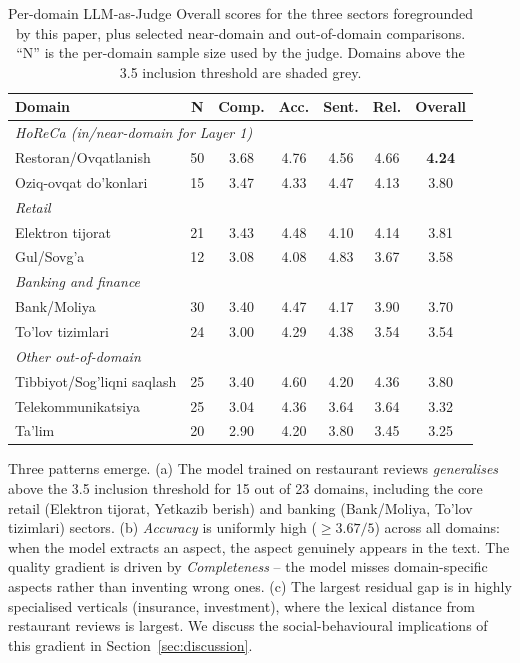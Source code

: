 \documentclass[runningheads]{llncs}
\begin{document}
\begin{table}[!htbp]
\centering
\caption{Per-domain LLM-as-Judge Overall scores for the three sectors
foregrounded by this paper, plus selected near-domain and out-of-domain
comparisons. ``N'' is the per-domain sample size used by the judge.
Domains above the 3.5 inclusion threshold are shaded grey.}
\label{tab:judge-domain}
\renewcommand{\arraystretch}{1.1}
\setlength{\tabcolsep}{6pt}
\begin{tabular}{l|c|ccccc}
\toprule
\textbf{Domain} & \textbf{N} & Comp. & Acc. & Sent. & Rel. & \textbf{Overall} \\
\midrule
\multicolumn{7}{l}{\textit{HoReCa (in/near-domain for Layer 1)}} \\
Restoran/Ovqatlanish      & 50 & 3.68 & 4.76 & 4.56 & 4.66 & \textbf{4.24} \\
Oziq-ovqat do'konlari     & 15 & 3.47 & 4.33 & 4.47 & 4.13 & 3.80 \\
\midrule
\multicolumn{7}{l}{\textit{Retail}} \\
Elektron tijorat          & 21 & 3.43 & 4.48 & 4.10 & 4.14 & 3.81 \\
Gul/Sovg'a                & 12 & 3.08 & 4.08 & 4.83 & 3.67 & 3.58 \\
\midrule
\multicolumn{7}{l}{\textit{Banking and finance}} \\
Bank/Moliya               & 30 & 3.40 & 4.47 & 4.17 & 3.90 & 3.70 \\
To'lov tizimlari          & 24 & 3.00 & 4.29 & 4.38 & 3.54 & 3.54 \\
\midrule
\multicolumn{7}{l}{\textit{Other out-of-domain}} \\
Tibbiyot/Sog'liqni saqlash & 25 & 3.40 & 4.60 & 4.20 & 4.36 & 3.80 \\
Telekommunikatsiya         & 25 & 3.04 & 4.36 & 3.64 & 3.64 & 3.32 \\
Ta'lim                     & 20 & 2.90 & 4.20 & 3.80 & 3.45 & 3.25 \\
\bottomrule
\end{tabular}
\end{table}

Three patterns emerge. (a) The model trained on restaurant reviews
\emph{generalises} above the 3.5 inclusion threshold for 15 out of
23 domains, including the core retail (Elektron tijorat, Yetkazib
berish) and banking (Bank/Moliya, To'lov tizimlari) sectors. (b)
\emph{Accuracy} is uniformly high ($\geq 3.67/5$) across all domains:
when the model extracts an aspect, the aspect genuinely appears in the
text. The quality gradient is driven by \emph{Completeness} -- the
model misses domain-specific aspects rather than inventing wrong ones.
(c) The largest residual gap is in highly specialised verticals
(insurance, investment), where the lexical distance from restaurant
reviews is largest. We discuss the social-behavioural implications of
this gradient in Section~\ref{sec:discussion}.
\end{document}
